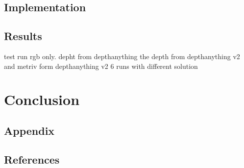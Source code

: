 \section{Implementation}
\section{Results}
test run rgb only. depht from depthanything the depth from depthanything v2 and metriv form depthanything v2 6 runs with different solution
\chapter{Conclusion}
\section{Appendix}

\section{References}
